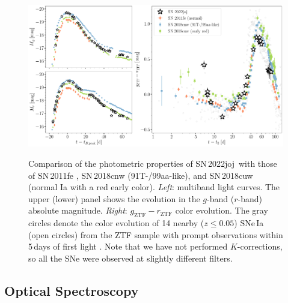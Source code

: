 \documentclass[twocolumn]{aastex631}
\newcommand{\sn}{SN\,2022joj}
\begin{document}
\begin{CJK*}{UTF8}{gbsn}
\begin{figure}
    \centering
    \includegraphics[width=\textwidth]{photometry.pdf}
    \label{fig:lc}
    \caption{Comparison of the photometric properties of \sn\ with those of SN\,2011fe \citep[normal Ia;][]{Pereira_2013}, SN\,2018cnw (91T-/99aa-like), and SN\,2018cuw (normal Ia with a red early color). \textit{Left}: multiband light curves. The upper (lower) panel shows the evolution in the $g$-band ($r$-band) absolute magnitude. %
    \textit{Right}: $g_\mathrm{ZTF}-r_\mathrm{ZTF}$ color evolution. %
    The gray circles denote the color evolution of 14 nearby ($z\le0.05$) SNe\,Ia (open circles) from the ZTF sample with prompt observations within 5\,days of first light \citep{Bulla2020}. Note that we have not performed $K$-corrections, so all the SNe were observed at slightly different filters.}
\end{figure}

\subsection{Optical Spectroscopy}\label{sec:optical_spec}


\end{CJK*}
\end{document}
